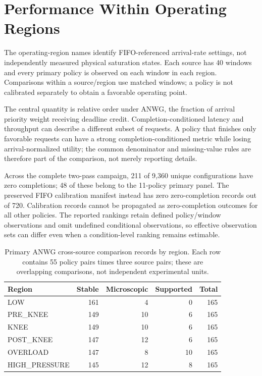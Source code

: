 \section{Performance Within Operating Regions}\label{sec:within}
The operating-region names identify FIFO-referenced arrival-rate settings,
not independently measured physical saturation states. Each source has
40 windows and every primary policy is observed on each window in each
region. Comparisons within a source/region use matched windows; a policy
is not calibrated separately to obtain a favorable operating point.

The central quantity is relative order under ANWG, the fraction of arrival
priority weight receiving deadline credit. Completion-conditioned latency
and throughput can describe a different subset of requests. A policy that
finishes only favorable requests can have a strong completion-conditioned
metric while losing arrival-normalized utility; the common denominator
and missing-value rules are therefore part of the comparison, not merely
reporting details.

Across the complete two-pass campaign, 211 of 9,360 unique configurations
have zero completions; 48 of these belong to the 11-policy primary panel.
The preserved FIFO calibration manifest instead has zero zero-completion records out of 720. Calibration records cannot be propagated as zero-completion
outcomes for all other policies. The reported rankings retain defined
policy/window observations and omit undefined conditional observations,
so effective observation sets can differ even when a condition-level
ranking remains estimable.

\begin{table}[t]\centering
\caption{Primary ANWG cross-source comparison records by region. Each row
contains 55 policy pairs times three source pairs; these are overlapping
comparisons, not independent experimental units.}\label{tab:region-counts}
\begin{tabular}{lrrrr}\toprule
Region & Stable & Microscopic & Supported & Total\\\midrule
LOW & 161 & 4 & 0 & 165\\
PRE\_KNEE & 149 & 10 & 6 & 165\\
KNEE & 149 & 10 & 6 & 165\\
POST\_KNEE & 147 & 12 & 6 & 165\\
OVERLOAD & 147 & 8 & 10 & 165\\
HIGH\_PRESSURE & 145 & 12 & 8 & 165\\\bottomrule
\end{tabular}
\end{table}

